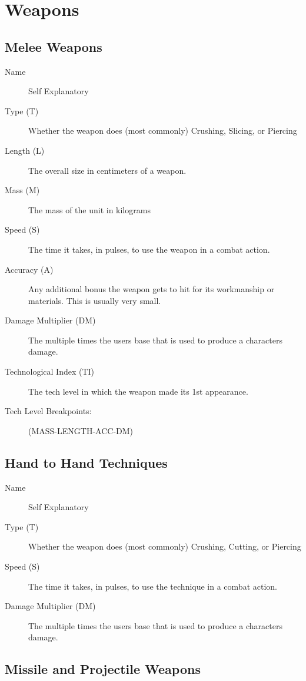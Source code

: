 \chapter{Weapons}

\section{Melee Weapons}

\begin{description}
	\item[Name]
	Self Explanatory
	\item[Type (T)]
	Whether the weapon does (most commonly) Crushing, Slicing, or Piercing
	\item[Length (L)]
	The overall size in centimeters of a weapon.
	\item[Mass (M)]
	The mass of the unit in kilograms
	\item[Speed (S)]
	The time it takes, in pulses, to use the weapon in a combat action.
	\item[Accuracy (A)]
	Any additional bonus the weapon gets to hit for its workmanship or
	materials. This is usually very small.
	\item[Damage Multiplier (DM)]
	The multiple times the users base that is used to produce a characters
	damage.
	\item[Technological Index (TI)]
	The tech level in which the weapon made its 1st appearance.
	\item[Tech Level Breakpoints:]
	(MASS-LENGTH-ACC-DM)
\end{description}

\clearpage
\section{Hand to Hand Techniques}

\begin{description}
	\item[Name]
	Self Explanatory
	\item[Type (T)]
	Whether the weapon does (most commonly) Crushing, Cutting, or Piercing
	\item[Speed (S)]
	The time it takes, in pulses, to use the technique in a combat action.
	\item[Damage Multiplier (DM)]
	The multiple times the users base that is used to produce a characters
	damage.
\end{description}

\clearpage
\section{Missile and Projectile Weapons}


